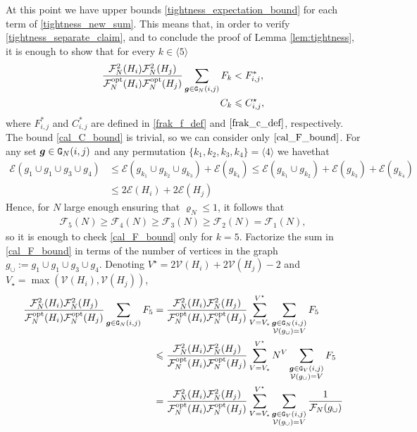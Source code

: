 \documentclass[11pt,reqno]{amsart}
\numberwithin{equation}{section}
\newcommand{\sprod}[1]{\langle#1\rangle}
\newcommand{\nelem}[1]{{Lemma \ref{#1}}}
\newcommand{\kb}[1]{\boldsymbol{#1}}
\newcommand{\vk}[1]{\kb{#1}}
\begin{document}
{At this point we have upper bounds \eqref{tightness_expectation_bound} for each term of \eqref{tightness_new_sum}.}
This means that, in order to verify \eqref{tightness_separate_claim}, {and to conclude the proof of \nelem{lem:tightness},} it is enough to show that for every $k\in\sprod{5}$
\begin{align}
    \frac{\mathcal{F}_N^2({H}_i)\mathcal{F}_N^2({H}_j)}{\mathcal{F}^{\rm opt}_N({H}_i)\mathcal{F}^{\rm opt}_N({H}_j)}\sum_{\vk g\in{\tt G}_{N}(i,j)} F_k &< F^*_{i,j},\label{cal_F_bound}\\
    C_k&\leqslant C^{\star}_{i,j},\label{cal_C_bound}
\end{align}
where $F^*_{i,j}$ and $C^*_{i,j}$ are defined in \eqref{frak_f_def} and $\eqref{frak_c_def}$, respectively. The bound \eqref{cal_C_bound} is trivial, so we can consider only $\eqref{cal_F_bound}$. For any set $\vk g\in{\tt G}_{N}(i,j)$ and any permutation $\{k_1,k_2,k_3,k_4\}=\sprod{4}$ we havethat
\begin{align*}
    \mathcal{E}(g_1\cup g_1\cup g_3\cup g_4)&\leqslant \mathcal{E}(g_{k_1}\cup g_{k_2}\cup g_{k_3}) + \mathcal{E}(g_{k_4})\leqslant \mathcal{E}(g_{k_1}\cup g_{k_2}) + \mathcal{E}(g_{k_3})+\mathcal{E}(g_{k_4}) \\&\leqslant 2\mathcal{E}({H_i})+2\mathcal{E}({H_j})
\end{align*}
Hence, for $N$ large enough ensuring that $\varrho_N\leqslant 1$, it follows that
\begin{align*}
    \mathcal{F}_5(N)\geqslant \mathcal{F}_4(N)\geqslant \mathcal{F}_3(N)\geqslant \mathcal{F}_2(N)= \mathcal{F}_1(N),
\end{align*}
so it is enough to check \eqref{cal_F_bound} only for $k=5$. Factorize the sum in \eqref{cal_F_bound} in terms of the number of vertices in the graph $g_{\cup}:=g_1\cup g_1\cup g_3\cup g_4$. Denoting $V^{\star} = 2\mathcal{V}({H}_i) + 2\mathcal{V}({H_j}) - 2$ and $V_{\star} = \max(\mathcal{V}({H}_i),\mathcal{V}({H}_j))$,
\begin{align}
    \frac{\mathcal{F}_N^2({H}_i)\mathcal{F}_N^2({H}_j)}{\mathcal{F}^{\rm opt}_N({H}_i)\mathcal{F}^{\rm opt}_N({H}_j)}\sum_{\vk g\in{\tt G}_{N}(i,j)} F_5 &= \frac{\mathcal{F}_N^2({H}_i)\mathcal{F}_N^2({H}_j)}{\mathcal{F}^{\rm opt}_N({H}_i)\mathcal{F}^{\rm opt}_N({H}_j)}\sum_{V=V_{\star}}^{V^{\star}}\sum_{\substack{\vk g\in{\tt G}_{N}(i,j) \\ \mathcal{V}(g_{\cup}) = V}} F_5\notag\\
    &\leqslant \frac{\mathcal{F}_N^2({H}_i)\mathcal{F}_N^2({H}_j)}{\mathcal{F}^{\rm opt}_N({H}_i)\mathcal{F}^{\rm opt}_N({H}_j)}\sum_{V=V_{\star}}^{V^{\star}}N^{V}\sum_{\substack{\vk g\in{\tt G}_{V}(i,j) \\ \mathcal{V}(g_{\cup}) = V}} F_5\notag\\
    &= \frac{\mathcal{F}_N^2({H}_i)\mathcal{F}_N^2({H}_j)}{\mathcal{F}^{\rm opt}_N({H}_i)\mathcal{F}^{\rm opt}_N({H}_j)}\sum_{V=V_{\star}}^{V^{\star}}\sum_{\substack{\vk g\in{\tt G}_{V}(i,j) \\ \mathcal{V}(g_{\cup}) = V}} \frac{1}{\mathcal{F}_N(g_{\cup})}\label{tightness_final_sum}
\end{align}
\end{document}
